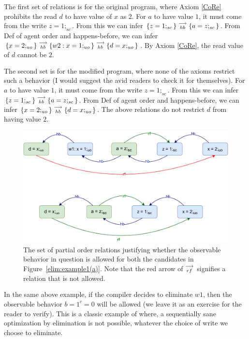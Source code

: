        The first set of relations is for the original program, where Axiom \ref{CoRe} prohibits the read $d$ to have value of $x$ as $2$.
        For $a$ to have value $1$, it must come from the write $z=1;_{sc}$.
        From this we can infer $\{z=1;_{sc}\}\stackrel{\longrightarrow}{_{hb}}\{a=z;_{sc}\}$.
        From Def of agent order and happens-before, we can infer $\{x=2;_{uo}\}\stackrel{\longrightarrow}{_{hb}}\{w2:x=1;_{uo}\}\stackrel{\longrightarrow}{_{hb}}\{d=x;_{uo}\}$.
        By Axiom \ref{CoRe}, the read value of $d$ cannot be $2$. 
    
        The second set is for the modified program, where none of the axioms restrict such a behavior (I would suggest the avid readers to check it for themselves).
        For $a$ to have value $1$, it must come from the write $z=1;_{sc}$.
        From this we can infer $\{z=1;_{sc}\}\stackrel{\longrightarrow}{_{hb}}\{a=z;_{sc}\}$.
        From Def of agent order and happens-before, we can infer $\{x=2;_{uo}\}\stackrel{\longrightarrow}{_{hb}}\{d=x;_{uo}\}$.
        The above relations do not restrict $d$ from having value $2$.
    
        \begin{figure}[H]
            \centering
            \includegraphics[scale=0.7]{5.Elimination/EliminationExample1(b).pdf}
            \caption{The set of partial order relations justifying whether the observable behavior in question is allowed for both the candidates in Figure~\ref{elim:example1(a)}. Note that the red arrow of $\stackrel{\longrightarrow}{_{rf}}$ signifies a relation that is not allowed.} 
            \label{elim:example1(b)}
        \end{figure}

        In the same above example, if the compiler decides to eliminate $w1$, then the observable behavior $b=1 ^ c=0$ will be allowed (we leave it as an exercise for the reader to verify).
        This is a classic example of where, a sequentially sane optimization by elimination is not possible, whatever the choice of write we choose to eliminate.  

